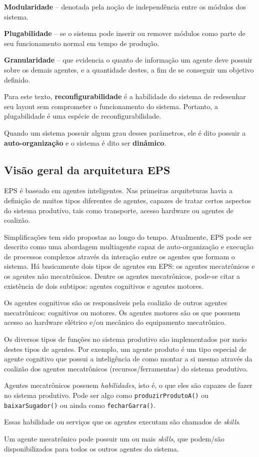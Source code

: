 \textbf{Modularidade} -- denotada pela noção de independência entre os módulos dos sistema.

\textbf{Plugabilidade} -- se o sistema pode inserir ou remover módulos como parte de seu funcionamento normal em tempo de produção.

\textbf{Granularidade} -- que evidencia o quanto de informação um agente deve possuir sobre os demais agentes, e a quantidade destes, a fim de se conseguir um objetivo definido.

Para este texto, \textbf{reconfigurabilidade} é a habilidade do sistema de redesenhar seu layout sem comprometer o funcionamento do sistema. Portanto, a plugabilidade é uma espécie de reconfigurabilidade. 

Quando um sistema possuir algum grau desses parâmetros, ele é dito possuir a \textbf{auto-organização} e o sistema é dito ser \textbf{dinâmico}.


\subsection{Visão geral da arquitetura EPS}

EPS é baseado em agentes inteligentes. Nas primeiras arquiteturas havia a definição de muitos tipos diferentes de agentes, capazes de tratar certos aspectos do sistema produtivo, tais como transporte, acesso hardware ou agentes de coalizão.

Simplificações tem sido propostas ao longo do tempo. Atualmente, EPS pode ser descrito como uma abordagem multiagente capaz de auto-organização e execução de processos complexos através da interação entre os agentes que formam o sistema. Há basicamente dois tipos de agentes em EPS: os agentes mecatrônicos e os agentes não mecatrônicos. Dentre os agentes mecatrônicos, pode-se citar a existência de dois subtipos: agentes cognitivos e agentes motores. 

Os agentes cognitivos são os responsáveis pela coalizão de outros agentes mecatrônicos: cognitivos ou motores. Os agentes motores são os que possuem acesso ao hardware elétrico e/ou mecânico do equipamento mecatrônico.

Os diversos tipos de funções no sistema produtivo são implementados por meio destes tipos de agentes. Por exemplo, um agente produto é um tipo especial de agente cognitivo que possui a inteligência de como montar a si mesmo através da coalizão dos agentes mecatrônicos (recursos/ferramentas) do sistema produtivo.

Agentes mecatrônicos possuem \textit{habilidades}, isto é, o que eles são capazes de fazer no sistema produtivo. Pode ser algo como \texttt{produzirProdutoA()} ou \texttt{baixarSugador()} ou ainda como \texttt{fecharGarra()}. \par 
Essas habilidade ou serviços que os agentes executam são chamados de \textit{skills}. \par 
Um agente mecatrônico pode possuir um ou mais \textit{skills}, que podem/são disponibilizados para todos os outros agentes do sistema.

